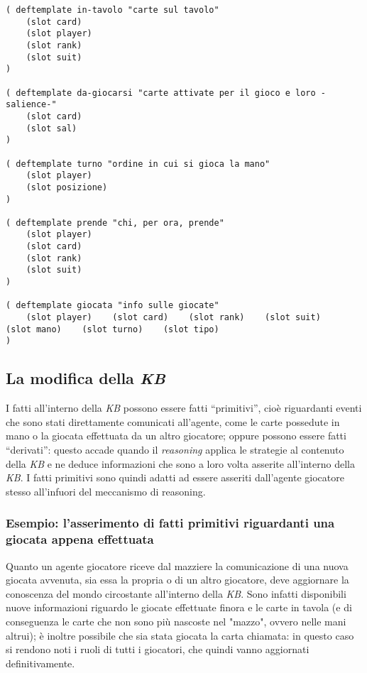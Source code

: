 \begin{lstlisting}[caption={Alcuni template di fatti la cui validità è limitata alla giocata corrente}, label=fattidiMano]
( deftemplate in-tavolo "carte sul tavolo"
    (slot card)
    (slot player)
    (slot rank)
    (slot suit)
)

( deftemplate da-giocarsi "carte attivate per il gioco e loro -salience-"
    (slot card)
    (slot sal)
)

( deftemplate turno "ordine in cui si gioca la mano"
    (slot player)
    (slot posizione)
)

( deftemplate prende "chi, per ora, prende"
    (slot player)
    (slot card)
    (slot rank)
    (slot suit)
)

( deftemplate giocata "info sulle giocate"
    (slot player)    (slot card)    (slot rank)    (slot suit)    (slot mano)    (slot turno)    (slot tipo)
)
\end{lstlisting}




\subsection{La modifica della \emph{KB}}

I fatti all'interno della \emph{KB} possono essere fatti ``primitivi'', cioè riguardanti eventi che sono stati direttamente comunicati all'agente, come le carte possedute in mano o la giocata effettuata da un altro giocatore; oppure possono essere fatti ``derivati'': questo accade quando il \emph{reasoning} applica le strategie al contenuto della \emph{KB} e ne deduce informazioni che sono a loro volta asserite all'interno della \emph{KB}.
I fatti primitivi sono quindi adatti ad essere asseriti dall'agente giocatore stesso all'infuori del meccanismo di reasoning.

\subsubsection*{Esempio: l'asserimento di fatti primitivi riguardanti una giocata appena effettuata}

Quanto un agente giocatore riceve dal mazziere la comunicazione di una nuova giocata avvenuta, sia essa la propria o di un altro giocatore, deve aggiornare la conoscenza del mondo circostante all'interno della \emph{KB}.
Sono infatti disponibili nuove informazioni riguardo le giocate effettuate finora e le carte in tavola (e di conseguenza le carte che non sono più nascoste nel "mazzo", ovvero nelle mani altrui); è inoltre possibile che sia stata giocata la carta chiamata: in questo caso si rendono noti i ruoli di tutti i giocatori, che quindi vanno aggiornati definitivamente.



